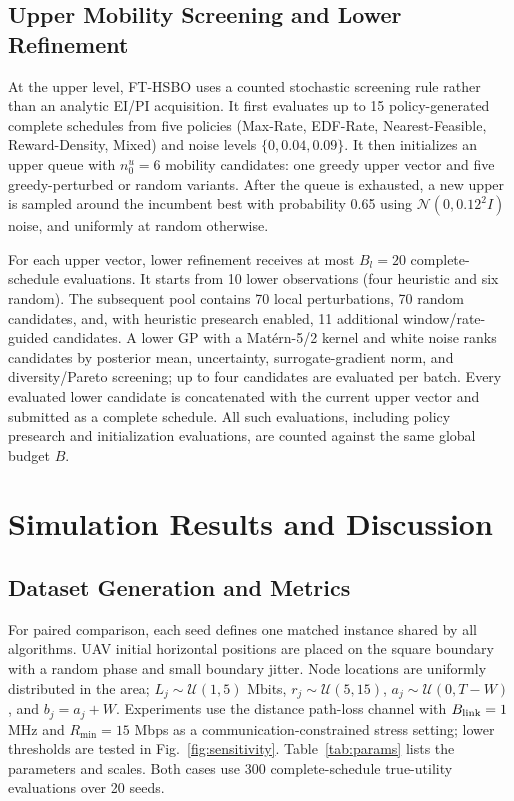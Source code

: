 \documentclass[letterpaper,journal]{IEEEtran}
\begin{document}
\subsection{Upper Mobility Screening and Lower Refinement}
At the upper level, FT-HSBO uses a counted stochastic screening rule rather than an analytic EI/PI acquisition. It first evaluates up to 15 policy-generated complete schedules from five policies (Max-Rate, EDF-Rate, Nearest-Feasible, Reward-Density, Mixed) and noise levels $\{0,0.04,0.09\}$. It then initializes an upper queue with $n_0^u=6$ mobility candidates: one greedy upper vector and five greedy-perturbed or random variants. After the queue is exhausted, a new upper is sampled around the incumbent best with probability 0.65 using $\mathcal{N}(0,0.12^2I)$ noise, and uniformly at random otherwise.

For each upper vector, lower refinement receives at most $B_l=20$ complete-schedule evaluations. It starts from 10 lower observations (four heuristic and six random). The subsequent pool contains 70 local perturbations, 70 random candidates, and, with heuristic presearch enabled, 11 additional window/rate-guided candidates. A lower GP with a Mat\'ern-5/2 kernel and white noise ranks candidates by posterior mean, uncertainty, surrogate-gradient norm, and diversity/Pareto screening; up to four candidates are evaluated per batch. Every evaluated lower candidate is concatenated with the current upper vector and submitted as a complete schedule. All such evaluations, including policy presearch and initialization evaluations, are counted against the same global budget $B$.

\FloatBarrier
\section{Simulation Results and Discussion}
\subsection{Dataset Generation and Metrics}
For paired comparison, each seed defines one matched instance shared by all algorithms. UAV initial horizontal positions are placed on the square boundary with a random phase and small boundary jitter. Node locations are uniformly distributed in the area; $L_j\sim\mathcal{U}(1,5)$ Mbits, $r_j\sim\mathcal{U}(5,15)$, $a_j\sim\mathcal{U}(0,T-W)$, and $b_j=a_j+W$. Experiments use the distance path-loss channel with $B_{\rm link}=1$ MHz and $R_{\min}=15$ Mbps as a communication-constrained stress setting; lower thresholds are tested in Fig.~\ref{fig:sensitivity}. Table~\ref{tab:params} lists the parameters and scales. Both cases use 300 complete-schedule true-utility evaluations over 20 seeds.
\end{document}
